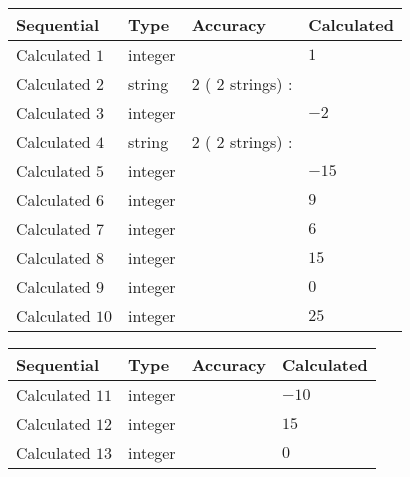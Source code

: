 \documentclass[12pt]{article}
\begin{document}
  
\noindent\begin{tabular}{|l|l|l|l|}
\hline
 Sequential & Type & Accuracy & Calculated \\ 
\hline
 
 
  Calculated $           1$ & integer &  & 
  $ 1 $ 
 \\  \hline  
 
 
  Calculated $           2$ & string & $           2 $ ( $          2 $ strings)
 : 
 & 
 \\  \hline  
 
 
  Calculated $           3$ & integer &  & 
  $ -2 $ 
 \\  \hline  
 
 
  Calculated $           4$ & string & $           2 $ ( $          2 $ strings)
 : 
 & 
 \\  \hline  
 
 
  Calculated $           5$ & integer &  & 
  $ -15 $ 
 \\  \hline  
 
 
  Calculated $           6$ & integer &  & 
  $ 9 $ 
 \\  \hline  
 
 
  Calculated $           7$ & integer &  & 
  $ 6 $ 
 \\  \hline  
 
 
  Calculated $           8$ & integer &  & 
  $ 15 $ 
 \\  \hline  
 
 
  Calculated $           9$ & integer &  & 
  $ 0 $ 
 \\  \hline  
 
 
  Calculated $          10$ & integer &  & 
  $ 25 $ 
 \\  \hline  
 \end{tabular}
   
   
  
  
\noindent\begin{tabular}{|l|l|l|l|}
\hline
 Sequential & Type & Accuracy & Calculated \\ 
\hline
 
 
  Calculated $          11$ & integer &  & 
  $ -10 $ 
 \\  \hline  
 
 
  Calculated $          12$ & integer &  & 
  $ 15 $ 
 \\  \hline  
 
 
  Calculated $          13$ & integer &  & 
  $ 0 $ 
 \\  \hline  
 \end{tabular}
   
\end{document}
